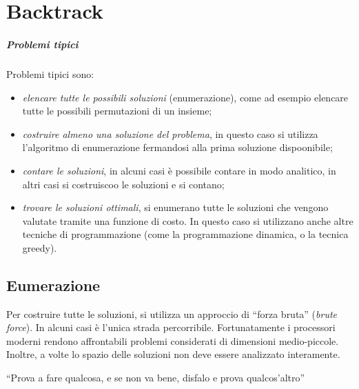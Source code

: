 
\ifsubfile
\pagestyle{plain}
\setcounter{chapter}{15}


\fi
\chapter{Backtrack}

\paragraph{Problemi tipici}
Problemi tipici sono:
\begin{itemize}
	\item \emph{elencare tutte le possibili soluzioni} (enumerazione), come ad esempio elencare tutte le possibili permutazioni di un insieme;
	\item \emph{costruire almeno una soluzione del problema}, in questo caso si utilizza l'algoritmo di enumerazione fermandosi alla prima soluzione dispoonibile;
	\item \emph{contare le soluzioni}, in alcuni casi è possibile contare in modo analitico, in altri casi si costruiscoo le soluzioni e si contano;
	\item \emph{trovare le soluzioni ottimali}, si enumerano tutte le soluzioni che vengono valutate tramite una funzione di costo.
	 	In questo caso si utilizzano anche altre tecniche di programmazione (come la programmazione dinamica, o la tecnica greedy).
\end{itemize}

\section{Eumerazione}

Per costruire tutte le soluzioni, si utilizza un approccio di \enquote{forza bruta} (\emph{brute force}).
In alcuni casi è l'unica strada percorribile.
Fortunatamente i processori moderni rendono affrontabili problemi considerati di dimensioni medio-piccole.
Inoltre, a volte lo spazio delle soluzioni non deve essere analizzato interamente.

\begin{idea}[backtracking]
\enquote{Prova a fare qualcosa, e se non va bene, disfalo e prova qualcos'altro}
\end{idea}

